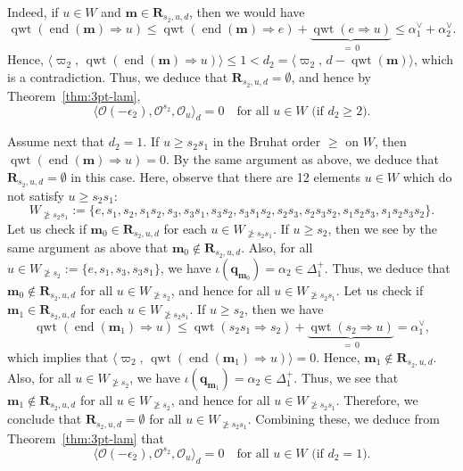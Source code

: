 \documentclass[11pt,a4paper,reqno,dvipdfmx]{amsart}
\numberwithin{equation}{section}
\newcommand{\CO}{\mathcal{O}}
\newcommand{\vpi}{\varpi}
\newcommand{\eps}{\epsilon}
\newcommand{\bm}{\mathbf{m}}
\newcommand{\bq}{\mathbf{q}}
\DeclareMathOperator{\qwt}{qwt}
\DeclareMathOperator{\ed}{end}
\newcommand{\pair}[2]{\langle #1,\,#2 \rangle}
\newcommand{\bfR}{\mathbf{R}}
\theoremstyle{plain}
\theoremstyle{definition}
\theoremstyle{remark}
\begin{document}
Indeed, if $u \in W$ and $\bm \in \bfR_{s_{2},u,d}$, then we would have 
%
\begin{equation*}
\qwt(\ed(\bm) \Rightarrow u) \le \qwt(\ed(\bm) \Rightarrow e) + \underbrace{\qwt(e \Rightarrow u)}_{= \, 0}
\le \alpha_{1}^{\vee} + \alpha_{2}^{\vee}. 
\end{equation*}
%
Hence, 
$\pair{\vpi_{2}}{\qwt(\ed(\bm) \Rightarrow u)} \le 1 < d_{2} 
= \pair{\vpi_{2}}{d - \qwt(\bm)}$, which is a contradiction. 
Thus, we deduce that $\bfR_{s_{2},u,d} = \emptyset$, 
and hence by Theorem~\ref{thm:3pt-lam}, 
%
\begin{equation*}
\langle \CO(- \eps_{2}),\CO^{s_{2}},\CO_{u} \rangle_{d} = 0 \quad 
\text{for all $u \in W$ (if $d_{2} \ge 2$)}. 
\end{equation*}

Assume next that $d_{2} = 1$. If $u \ge s_{2}s_{1}$ in the Bruhat order $\ge$ on $W$, then 
$\qwt(\ed(\bm) \Rightarrow u) = 0$. By the same argument as above, 
we deduce that $\bfR_{s_{2},u,d} = \emptyset$ in this case. 
Here, observe that there are 12 elements $u \in W$
which do not satisfy $u \ge s_{2}s_{1}$:
%
\begin{equation*}
W_{\not\ge s_2s_1}:=
\bigl\{ e, s_1, s_2, s_1s_2, s_3, s_3s_1, s_3s_2, s_3s_1s_2, 
s_2 s_3, s_2s_3s_2, s_1s_2s_3, s_1s_2s_3s_2 \bigr\}.
\end{equation*}
%
Let us check if $\bm_{0} \in \bfR_{s_{2},u,d}$ for each $u \in W_{\not \ge s_2s_1}$. 
If $u \ge s_{2}$, then we see by the same argument as above that $\bm_{0} \notin \bfR_{s_{2},u,d}$. 
Also, for all $u \in W_{\not\ge s_2}:=\bigl\{ e, s_1, s_3, s_3s_1 \bigr\}$, 
we have $\iota(\bq_{\bm_{0}}) = \alpha_{2} \in \Delta_{1}^{+}$. Thus, we deduce that 
$\bm_{0} \notin \bfR_{s_{2},u,d}$ for all $u \in W_{\not\ge s_2}$, 
and hence for all $u \in W_{\not\ge s_2s_1}$. 
%
Let us check if $\bm_{1} \in \bfR_{s_{2},u,d}$ for each $u \in W_{\not \ge s_2s_1}$. 
If $u \ge s_{2}$, then we have
%
\begin{equation*}
\qwt(\ed(\bm_{1}) \Rightarrow u) \le \qwt(s_2s_1 \Rightarrow s_2) + 
\underbrace{\qwt(s_2 \Rightarrow u)}_{= \, 0} = \alpha_{1}^{\vee}, 
\end{equation*}
%
which implies that 
$\pair{\vpi_{2}}{\qwt(\ed(\bm_{1}) \Rightarrow u)} = 0$. 
Hence, $\bm_{1} \not\in \bfR_{s_{2},u,d}$. 
Also, for all $u \in W_{\not\ge s_2}$, we have 
$\iota(\bq_{\bm_{1}}) = \alpha_{2} \in \Delta_{1}^{+}$. Thus, we see that 
$\bm_{1} \notin \bfR_{s_{2},u,d}$ for all $u \in W_{\not\ge s_2}$, and hence 
for all $u \in W_{\not\ge s_2s_1}$. 
Therefore, we conclude that $\bfR_{s_{2},u,d} = \emptyset$ 
for all $u \in W_{\not\ge s_2s_1}$. Combining these, 
we deduce from Theorem~\ref{thm:3pt-lam} that 
%
\begin{equation*}
\langle \CO(- \eps_{2}),\CO^{s_{2}},\CO_{u} \rangle_{d} = 0 \quad 
\text{for all $u \in W$ (if $d_{2} = 1$)}. 
\end{equation*}
\end{document}
